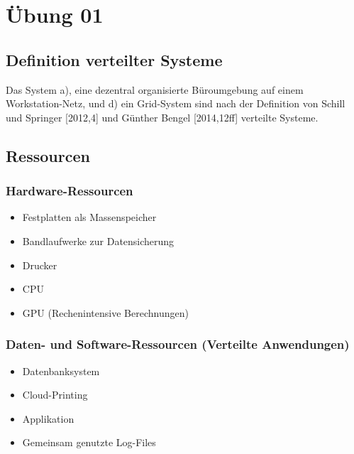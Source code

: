 \documentclass[a4paper]{scrartcl}
\begin{document}
\newpage

%
%

\thispagestyle{empty}

\tableofcontents

\newpage

%
%

\setcounter{page}{3}
\section{Übung 01}



\subsection{Definition verteilter Systeme}
Das System a), eine dezentral organisierte Büroumgebung auf einem Workstation-Netz, und d) ein Grid-System sind nach der Definition von Schill und Springer [2012,4] und Günther Bengel [2014,12ff] verteilte Systeme.

\subsection{Ressourcen}
	\subsubsection{Hardware-Ressourcen}
		\begin{itemize}
			\item Festplatten als Massenspeicher
			\item Bandlaufwerke zur Datensicherung
			\item Drucker
			\item CPU
			\item GPU (Rechenintensive Berechnungen)
		\end{itemize}
	\subsubsection{Daten- und Software-Ressourcen (Verteilte Anwendungen)}
		\begin{itemize}
			\item Datenbanksystem
			\item Cloud-Printing
			\item Applikation
			\item Gemeinsam genutzte Log-Files
		\end{itemize}
\end{document}
